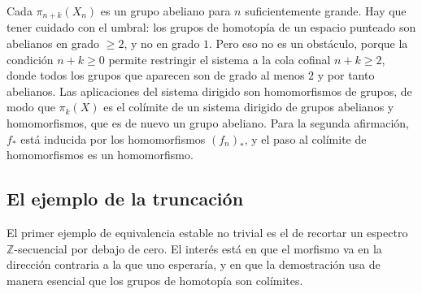 \begin{sol}
Cada $\pi_{n+k}(X_n)$ es un grupo abeliano para $n$ suficientemente grande. Hay que tener cuidado con el umbral: los grupos de homotopía de un espacio punteado son abelianos en grado $\ge2$, y no en grado $1$. Pero eso no es un obstáculo, porque la condición $n+k\ge0$ permite restringir el sistema a la cola cofinal $n+k\ge2$, donde todos los grupos que aparecen son de grado al menos $2$ y por tanto abelianos. Las aplicaciones del sistema dirigido son homomorfismos de grupos, de modo que $\pi_k(X)$ es el colímite de un sistema dirigido de grupos abelianos y homomorfismos, que es de nuevo un grupo abeliano. Para la segunda afirmación, $f_*$ está inducida por los homomorfismos $(f_n)_*$, y el paso al colímite de homomorfismos es un homomorfismo.
\end{sol}

\subsection{El ejemplo de la truncación}

El primer ejemplo de equivalencia estable no trivial es el de recortar un espectro $\mathbb Z$-secuencial por debajo de cero. El interés está en que el morfismo va en la dirección contraria a la que uno esperaría, y en que la demostración usa de manera esencial que los grupos de homotopía son colímites.

